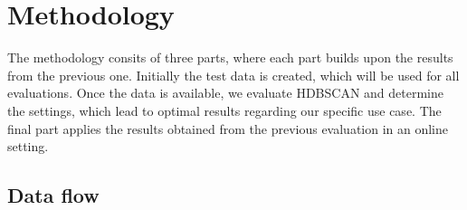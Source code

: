 \section{Methodology}

The methodology consits of three parts, where each part builds upon the results from the previous one.
Initially the test data is created, which will be used for all evaluations.
Once the data is available, we evaluate HDBSCAN and determine the settings,
which lead to optimal results regarding our specific use case.
The final part applies the results obtained from the previous evaluation in an online setting.

\subsection{Data flow}




